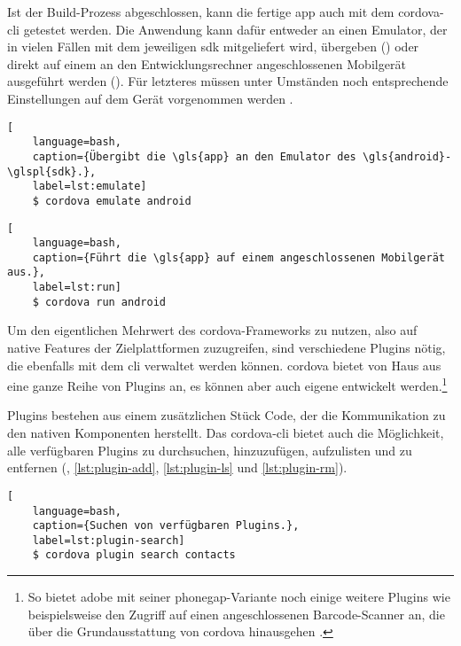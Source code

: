 {Ist der Build-Prozess abgeschlossen, kann die fertige \gls{app} auch mit dem \gls{cordova}-\gls{cli} getestet werden. 
Die Anwendung kann dafür entweder an einen Emulator, der in vielen Fällen mit dem jeweiligen \gls{sdk} mitgeliefert wird, übergeben () oder direkt auf einem an den Entwicklungsrechner angeschlossenen Mobilgerät ausgeführt werden ().
Für letzteres müssen unter Umständen noch entsprechende Einstellungen auf dem Gerät vorgenommen werden \cite{Cordova-Docs_CLI}.

\par\noindent\begin{minipage}{\linewidth}
\begin{lstlisting}[
	language=bash,
	caption={Übergibt die \gls{app} an den Emulator des \gls{android}-\glspl{sdk}.},
	label=lst:emulate]
	$ cordova emulate android
\end{lstlisting}

\begin{lstlisting}[
	language=bash,
	caption={Führt die \gls{app} auf einem angeschlossenen Mobilgerät aus.},
	label=lst:run]
	$ cordova run android
\end{lstlisting}
\end{minipage}\par\addvspace{\topskip}

Um den eigentlichen Mehrwert des \gls{cordova}-Frameworks zu nutzen, also auf native Features der Zielplattformen zuzugreifen, sind verschiedene Plugins nötig, die ebenfalls mit dem \gls{cli} verwaltet werden können.
\gls{cordova} bietet von Haus aus eine ganze Reihe von Plugins an, es können aber auch eigene entwickelt werden.\footnote{So bietet \zB \gls{adobe} mit seiner \gls{phonegap}-Variante noch einige weitere Plugins wie beispielsweise den Zugriff auf einen angeschlossenen Barcode-Scanner an, die über die Grundausstattung von \gls{cordova} hinausgehen \cite{Cordova-Docs_CLI}.}

Plugins bestehen aus einem zusätzlichen Stück Code, der die Kommunikation zu den nativen Komponenten herstellt.
Das \gls{cordova}-\gls{cli} bietet auch die Möglichkeit, alle verfügbaren Plugins zu durchsuchen, hinzuzufügen, aufzulisten und zu entfernen (, \ref{lst:plugin-add}, \ref{lst:plugin-ls} und \ref{lst:plugin-rm}).

\par\noindent\begin{minipage}{\linewidth}
\begin{lstlisting}[
	language=bash,
	caption={Suchen von verfügbaren Plugins.},
	label=lst:plugin-search]
	$ cordova plugin search contacts
\end{lstlisting}


\end{minipage}}
